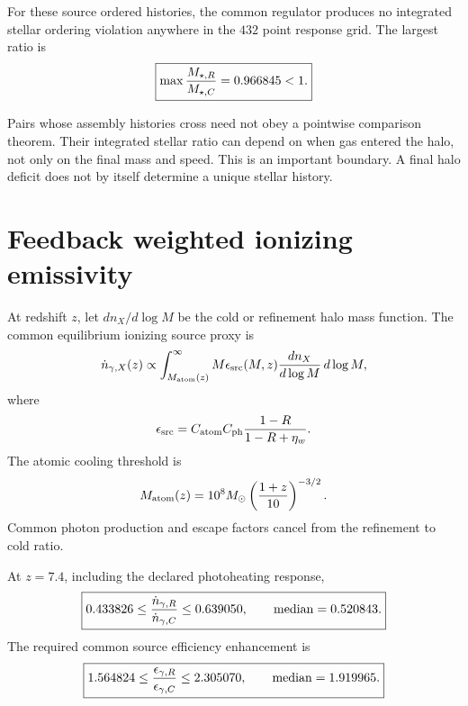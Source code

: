 For these source ordered histories, the common regulator produces no integrated stellar ordering violation anywhere in the $432$ point response grid.  The largest ratio is
\begin{equation}
\boxed{
\max
\frac{M_{\star,R}}{M_{\star,C}}
=
0.966845<1.
}
\label{eq:cfr-max-ordered-star}
\end{equation}

Pairs whose assembly histories cross need not obey a pointwise comparison theorem.  Their integrated stellar ratio can depend on when gas entered the halo, not only on the final mass and speed.  This is an important boundary.  A final halo deficit does not by itself determine a unique stellar history.

\section{Feedback weighted ionizing emissivity}

At redshift $z$, let $dn_X/d\log M$ be the cold or refinement halo mass function.  The common equilibrium ionizing source proxy is
\begin{equation}
\dot n_{\gamma,X}(z)
\propto
\int_{M_{\rm atom}(z)}^\infty
M
\epsilon_{\rm src}(M,z)
\frac{dn_X}{d\log M}
\,d\log M,
\label{eq:cfr-ionizing-source}
\end{equation}
where
\begin{equation}
\epsilon_{\rm src}
=
C_{\rm atom}C_{\rm ph}
\frac{1-R}{1-R+\eta_w}.
\label{eq:cfr-source-efficiency}
\end{equation}
The atomic cooling threshold is
\begin{equation}
M_{\rm atom}(z)
=
10^8M_\odot
\left(
\frac{1+z}{10}
\right)^{-3/2}.
\label{eq:cfr-atomic-mass}
\end{equation}
Common photon production and escape factors cancel from the refinement to cold ratio.

At $z=7.4$, including the declared photoheating response,
\begin{equation}
\boxed{
0.433826
\leq
\frac{\dot n_{\gamma,R}}{\dot n_{\gamma,C}}
\leq
0.639050,
\qquad
\operatorname{median}=0.520843.
}
\label{eq:cfr-ionizing-envelope}
\end{equation}
The required common source efficiency enhancement is
\begin{equation}
\boxed{
1.564824
\leq
\frac{\epsilon_{\gamma,R}}{\epsilon_{\gamma,C}}
\leq
2.305070,
\qquad
\operatorname{median}=1.919965.
}
\label{eq:cfr-ionizing-boost}
\end{equation}

